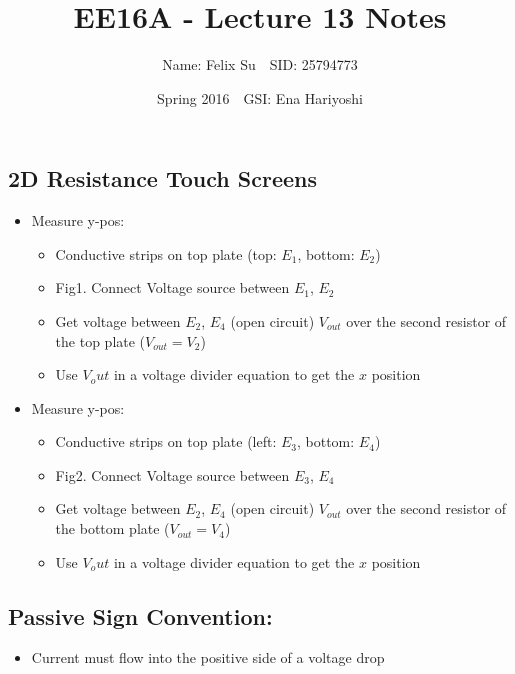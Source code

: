 \documentclass{article}\usepackage{amsmath,amssymb,amsthm,tikz,tkz-graph,color,chngpage,soul,hyperref,csquotes,graphicx,floatrow}\newcommand*{\QEDB}{\hfill\ensuremath{\square}}\newtheorem*{prop}{Proposition}\renewcommand{\theenumi}{\alph{enumi}}\usepackage[shortlabels]{enumitem}\usepackage[nobreak=true]{mdframed}\usetikzlibrary{matrix,calc}\MakeOuterQuote{"}\usepackage[margin=0.75in]{geometry} \newtheorem{theorem}{Theorem}
\title{EE16A - Lecture 13 Notes}
\author{Name: Felix Su$\quad$SID: 25794773}
\date{Spring 2016$\quad$GSI: Ena Hariyoshi}
\begin{document}
\maketitle

\subsection*{2D Resistance Touch Screens}
\begin{itemize}
    \item Measure y-pos:
    \begin{itemize}
        \item Conductive strips on top plate (top: $E_1$, bottom: $E_2$)
        \item Fig1. Connect Voltage source between $E_1$, $E_2$
        \item Get voltage between $E_2$, $E_4$ (open circuit) $V_{out}$ over the second resistor of the top plate ($V_{out} = V_2$)
        \item Use $V_out$ in a voltage divider equation to get the $x$ position
    \end{itemize}
    \item Measure y-pos:
    \begin{itemize}
        \item Conductive strips on top plate (left: $E_3$, bottom: $E_4$)
        \item Fig2. Connect Voltage source between $E_3$, $E_4$
        \item Get voltage between $E_2$, $E_4$ (open circuit) $V_{out}$ over the second resistor of the bottom plate ($V_{out} = V_4$)
        \item Use $V_out$ in a voltage divider equation to get the $x$ position
    \end{itemize}
\end{itemize}

\subsection*{Passive Sign Convention:}
\begin{itemize}
    \item Current must flow into the positive side of a voltage drop
\end{itemize}

\end{document}
